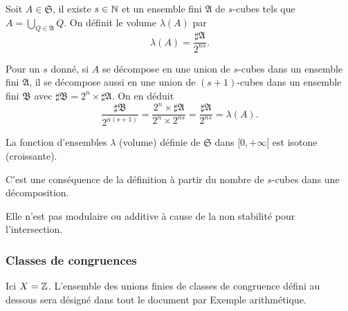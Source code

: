 \begin{defi}
Soit $A \in \mathfrak{S}$, il existe $s\in \mathbb{N}$ et un ensemble fini $\mathfrak{A}$ de $s$-cubes tels que $A = \bigcup_{Q\in \mathfrak{A}} Q$. On définit le volume $\lambda(A)$ par
\begin{displaymath}
 \lambda(A) = \frac{\sharp \mathfrak{A}}{2^{ns}}.
\end{displaymath}
\end{defi}
\begin{demo}
 Pour un $s$ donné, si $A$ se décompose en une union de $s$-cubes dans un ensemble fini $\mathfrak{A}$, il se décompose aussi en une union de $(s+1)$-cubes dans un ensemble fini $\mathfrak{B}$ avec $\sharp \mathfrak{B} = 2^n \times \sharp \mathfrak{A}$. On en déduit
 \begin{displaymath}
  \frac{\sharp \mathfrak{B}}{2^{n(s+1)}} = \frac{2^n \times \sharp \mathfrak{A}}{2^n \times 2^{ns}} = \frac{\sharp \mathfrak{A}}{2^{ns}} = \lambda(A).
 \end{displaymath}
\end{demo}
\begin{propn}
 La fonction d'ensembles $\lambda$ (volume) définie de $\mathfrak{S}$ dans $[0,+\infty[$ est isotone (croissante).
\end{propn}
\begin{demo}
 C'est une conséquence de la définition à partir du nombre de $s$-cubes dans une décomposition.
\end{demo}
Elle n'est pas modulaire ou additive à cause de la non stabilité pour l'intersection.

\subsubsection{Classes de congruences}
Ici $X = \mathbb{Z}$. 
L'ensemble des unions finies de classes de congruence défini au dessous sera désigné dans tout le document par \og Exemple arithmétique\fg.

